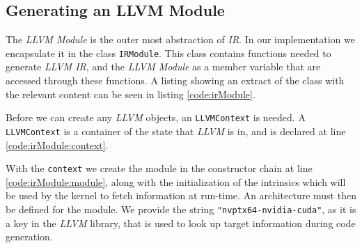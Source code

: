 \subsection{Generating an LLVM Module} \label{sec:irmodule}
The \textit{LLVM Module} is the outer most abstraction of \textit{IR}. In our implementation we encapsulate it in the class \texttt{IRModule}. This class contains functions needed to generate \textit{LLVM IR}, and the \textit{LLVM Module} as a member variable that are accessed through these functions. A listing showing an extract of the class with the relevant content can be seen in listing \ref{code:irModule}.

Before we can create any \textit{LLVM} objects, an \texttt{LLVMContext} is needed. A \texttt{LLVMContext} is a container of the state that \textit{LLVM} is in, and is declared at line \ref{code:irModule:context}.

With the \texttt{context} we create the module in the constructor chain at line \ref{code:irModule:module}, along with the initialization of the intrinsics which will be used by the kernel to fetch information at run-time. An architecture must then be defined for the module. We provide the string \texttt{"nvptx64-nvidia-cuda"}, as it is a key in the \textit{LLVM} library, that is used to look up target information during code generation. 

